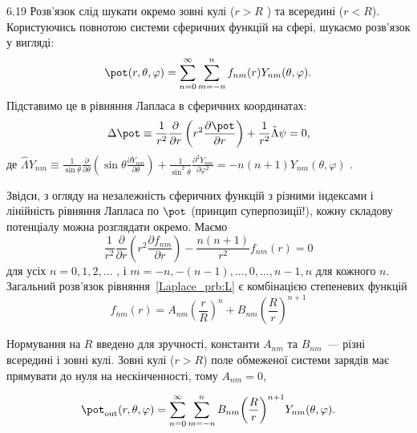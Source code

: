 \begin{Solution}{6.{19}}
	Розв'язок слід шукати окремо зовні кулі ($r >R$ ) та всередині ($r<R$). Користуючись повнотою системи сферичних функцій на сфері, шукаємо розв’язок у вигляді:
	\[
		\pot(r,\theta ,\varphi ) = \sum\limits_{n = 0}^\infty  {\sum\limits_{m =  - n}^n {{f_{nm}}(r){Y_{nm}}(\theta ,\varphi )} } .
	\]
	Підставимо це в рівняння Лапласа в сферичних координатах:
	\begin{equation}\label{Laplace_prb:L}
		\Delta \pot  \equiv \frac{1}{{{r^2}}}\frac{\partial }{{\partial r}}\left( {{r^2}\frac{{\partial \pot }}{{\partial r}}} \right) + \frac{1}{{{r^2}}}\hat \Lambda \psi  = 0,
	\end{equation}
	де \(\hat \Lambda {Y_{nm}} \equiv \frac{1}{{\sin \theta }}\frac{\partial }{{\partial \theta }}\left( {\sin \theta \frac{{\partial {Y_{nm}}}}{{\partial \theta }}} \right) + \frac{1}{{{{\sin }^2}\theta }}\frac{{{\partial ^2}{Y_{nm}}}}{{\partial {\varphi ^2}}} =  - n\left( {n + 1} \right){Y_{nm}}\left( {\theta ,\varphi } \right)\) .

	Звідси, з огляду на незалежність сферичних функцій з різними індексами і лінійність рівняння Лапласа по $\pot$  (принцип суперпозиції!), кожну складову потенціалу можна розглядати окремо. Маємо
	\[
		\frac{1}{{{r^2}}}\frac{\partial }{{\partial r}}\left( {{r^2}\frac{{\partial {f_{nm}}}}{{\partial r}}} \right) - \frac{{n\left( {n + 1} \right)}}{{{r^2}}}{f_{nm}}(r) = 0
	\]
	для усіх $n= 0,1,2,\ldots$ , і $m = -n, -(n-1), \ldots, 0, \ldots, n-1, n$  для кожного $n$.
	Загальний розв’язок рівняння~\eqref{Laplace_prb:L} є комбінацією степеневих функцій
	\begin{equation}\label{star_prb:L}
		f_{nm}(r) = A_{nm}{\left( {\frac{r}{R}} \right)^n} + {B_{nm}}{\left( {\frac{R}{r}} \right)^{n + 1}}
	\end{equation}

	Нормування на $R$ введено для зручності, константи $A_{nm}$ та $B_{nm}$~--- різні всередині і зовні кулі.
	Зовні кулі ($r >R$) поле обмеженої системи зарядів має прямувати до нуля на нескінченності, тому $A_{nm} = 0$,

	\begin{equation}\label{dstar_prb:L}
		\pot_\mathrm{out}(r,\theta ,\varphi ) = \sum\limits_{n = 0}^\infty  {\sum\limits_{m =  - n}^n {{B_{nm}}{{\left( {\frac{R}{r}} \right)}^{n + 1}}{Y_{nm}}(\theta ,\varphi )} }.
	\end{equation}


\end{Solution}
